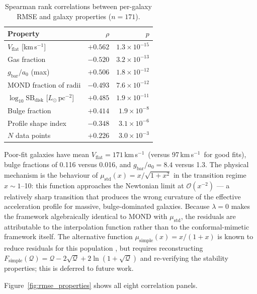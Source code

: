 \documentclass{aa}
\newcommand{\Q}{\mathcal{Q}}
\newcommand{\kms}{km\,s$^{-1}$}
\newcommand{\mstd}{\mu_\text{std}}
\newcommand{\gbar}{g_\text{bar}}
\newcommand{\azero}{a_0}
\begin{document}
\begin{table}
  \caption{Spearman rank correlations between per-galaxy RMSE and galaxy
    properties ($n = 171$).}
  \label{tab:correlations}
  \centering
  \begin{tabular}{lrr}
    \hline\hline
    Property & $\rho$ & $p$ \\
    \hline
    $V_\text{flat}$ [\kms]              & $+0.562$ & $1.3 \times 10^{-15}$ \\
    Gas fraction                         & $-0.520$ & $3.2 \times 10^{-13}$ \\
    $\gbar/\azero$ (max)                & $+0.506$ & $1.8 \times 10^{-12}$ \\
    MOND fraction of radii               & $-0.493$ & $7.6 \times 10^{-12}$ \\
    $\log_{10}\mathrm{SB}_\text{disk}$
      [$L_\odot\,\mathrm{pc}^{-2}$]    & $+0.485$ & $1.9 \times 10^{-11}$ \\
    Bulge fraction                       & $+0.414$ & $1.9 \times 10^{-8}$  \\
    Profile shape index                  & $-0.348$ & $3.1 \times 10^{-6}$  \\
    $N$ data points                      & $+0.226$ & $3.0 \times 10^{-3}$  \\
    \hline
  \end{tabular}
\end{table}

Poor-fit galaxies have mean $V_\text{flat} = 171$\,\kms\ (versus 97\,\kms\
for good fits), bulge fractions of 0.116 versus 0.016, and $\gbar/\azero = 8.4$
versus 1.3. The physical mechanism is the behaviour of $\mstd(x) = x/\sqrt{1+x^2}$
in the transition regime $x \sim 1$--10: this function approaches the Newtonian
limit at $\mathcal{O}(x^{-2})$ --- a relatively sharp transition that produces
the wrong curvature of the effective acceleration profile for massive,
bulge-dominated galaxies. Because $\lambda = 0$ makes the framework algebraically
identical to MOND with $\mstd$, the residuals are attributable to the
interpolation function rather than to the conformal-mimetic framework itself.
The alternative function $\mu_\text{simple}(x) = x/(1+x)$ is known to reduce
residuals for this population \citep{Li2018}, but requires reconstructing
$F_\text{simple}(\Q) = \Q - 2\sqrt{\Q} + 2\ln(1+\sqrt{\Q})$ and re-verifying
the stability properties; this is deferred to future work.

Figure~\ref{fig:rmse_properties} shows all eight correlation panels.
\end{document}
